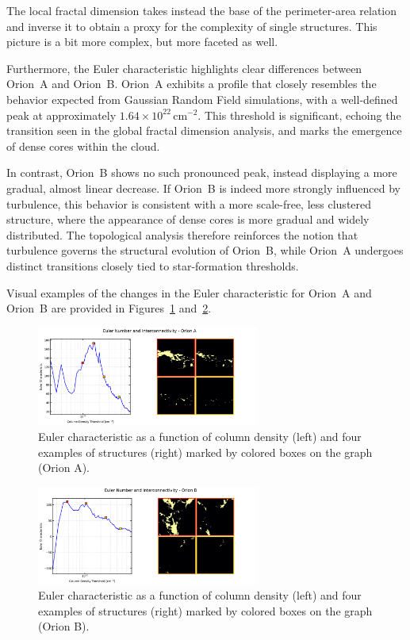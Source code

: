 The local fractal dimension takes instead the base of the perimeter-area relation and inverse it to obtain a proxy for the complexity of single structures.
This picture is a bit more complex, but more faceted as well.

Furthermore, the Euler characteristic highlights clear differences between Orion~A and Orion~B.  
Orion~A exhibits a profile that closely resembles the behavior expected from Gaussian Random Field simulations, with a well-defined peak at approximately \(1.64 \times 10^{22}\,\mathrm{cm}^{-2}\).  
This threshold is significant, echoing the transition seen in the global fractal dimension analysis, and marks the emergence of dense cores within the cloud.

In contrast, Orion~B shows no such pronounced peak, instead displaying a more gradual, almost linear decrease.  
If Orion~B is indeed more strongly influenced by turbulence, this behavior is consistent with a more scale-free, less clustered structure, where the appearance of dense cores is more gradual and widely distributed.  
The topological analysis therefore reinforces the notion that turbulence governs the structural evolution of Orion~B, while Orion~A undergoes distinct transitions closely tied to star-formation thresholds.

Visual examples of the changes in the Euler characteristic for Orion~A and Orion~B are provided in Figures~\ref{fig:Euler_Orion_A} and~\ref{fig:Euler_Orion_B}.

\begin{figure}[t]
    \centering
    \includegraphics[width=0.65\textwidth]{figures/euler_Orion_A.png}
    \caption{Euler characteristic as a function of column density (left) and four examples of structures (right) marked by colored boxes on the graph (Orion A).}
    \label{fig:Euler_Orion_A}
\end{figure}

\begin{figure}[t]
    \centering
    \includegraphics[width=0.65\textwidth]{figures/euler_Orion_B.png}
    \caption{Euler characteristic as a function of column density (left) and four examples of structures (right) marked by colored boxes on the graph (Orion B).}
    \label{fig:Euler_Orion_B}
\end{figure}


